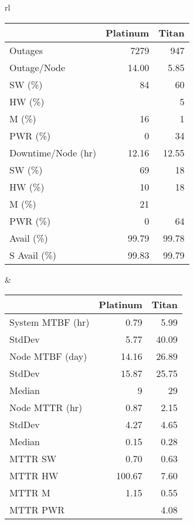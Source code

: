\documentclass[10pt,twocolumn]{article}
\begin{document}
\begin{table*}
\begin{center}

\small{

\begin{tabular}{rl}

 \begin{tabular}{|l|r|r|}
 \hline
              & Platinum   & Titan  \\
 \hline
 Outages      &  7279     &  947   \\
 Outage/Node  &   14.00  &   5.85 \\
 SW (\%)  &  84       &  60   \\
 HW (\%)  &     &   5   \\
 M  (\%)  &  16       &   1   \\
 PWR (\%) &  0        &  34   \\
 \hline
 Downtime/Node (hr) &  12.16 &   12.55   \\
 SW (\%)  &  69       &  18   \\
 HW (\%)  &  10       &  18   \\
 M  (\%)  &  21       &   \\
 PWR (\%) &  0        &  64   \\
 \hline
 Avail (\%)    &  99.79 & 99.78 \\
 \hline
 S Avail (\%)  &  99.83 & 99.79 \\
 \hline
 \end{tabular}

&

 \begin{tabular}{|l|r|r|}
 \hline
              & Platinum   & Titan  \\
 \hline
 System MTBF (hr) &  0.79   &  5.99 \\
 StdDev      &  5.77       &  40.09 \\
 \hline
 Node  MTBF (day)  &  14.16  &  26.89 \\
 StdDev      & 15.87       &  25.75 \\
 Median      &  9          &   29   \\
 \hline
 Node MTTR (hr) &  0.87  & 2.15 \\
 StdDev      &  4.27       & 4.65  \\
 Median      &  0.15       & 0.28  \\
 \hline
 MTTR SW     &  0.70     & 0.63  \\
 MTTR HW     &  100.67   & 7.60  \\
 MTTR M      &  1.15     & 0.55  \\
 MTTR PWR    &        & 4.08  \\
 \hline
 \end{tabular}

\end{tabular}

}


\caption{Platinum and Titan Failure Data Summary}
\label{tbl:failuredataPT}
\end{center}
\end{table*}
\end{document}
